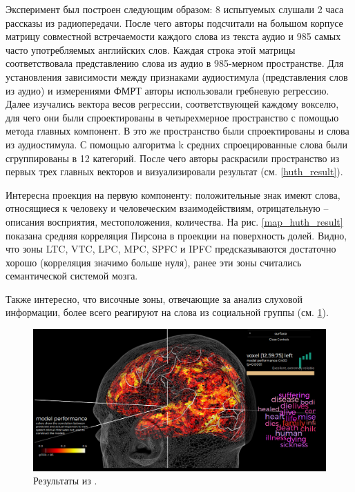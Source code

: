 \documentclass[pdftex,ptm,12pt,a4paper]{report}
\theoremstyle{definition}
\begin{document}
Эксперимент был построен следующим образом: 8 испытуемых слушали 2 часа рассказы из радиопередачи. После чего авторы подсчитали на большом корпусе матрицу совместной встречаемости каждого слова из текста аудио и 985 самых часто употребляемых английских слов. Каждая строка этой матрицы соответствовала представлению слова из аудио в 985-мерном пространстве. Для установления зависимости между признаками аудиостимула (представления слов из аудио) и измерениями ФМРТ авторы использовали гребневую регрессию. 
Далее изучались вектора весов регрессии, соответствующей каждому вокселю, для чего они были спроектированы в четырехмерное пространство с помощью метода главных компонент. В это же пространство были спроектированы и слова из аудиостимула. 
С помощью алгоритма k средних спроецированные слова были сгруппированы в 12 категорий. После чего авторы раскрасили пространство из первых трех главных векторов и визуализировали результат (см. \ref{huth_result}). 

Интересна проекция на первую компоненту: положительные знак имеют слова, относящиеся к человеку и человеческим взаимодействиям, отрицательную -- описания восприятия, местоположения, количества. На рис. \ref{map_huth_result} показана средняя корреляция Пирсона в проекции на поверхность долей. Видно, что зоны LTC, VTC, LPC, MPC, SPFC и IPFC предсказываются достаточно хорошо (корреляция значимо больше нуля), ранее эти зоны считались семантической системой мозга.

Также интересно, что височные зоны, отвечающие за анализ слуховой информации, более всего реагируют на слова из социальной группы (см. \ref{gallant_visoc}).

\begin{figure}[h]
\includegraphics[scale=0.3]{images/gallant_view1.png}
\centering
\caption{Результаты из \cite{huth2016natural}.}
\label{gallant_visoc}
\end{figure}
\end{document}
